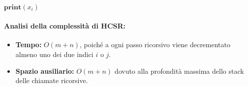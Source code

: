 \begin{algorithm}[H]
\caption{Ricostruzione della soluzione HCS}\label{alg:hcsr}
\begin{algorithmic}[1]
        \State \Return
    \EndIf
            \State {}
        \Else
            \State {}
        \EndIf
    \Else
        \State {}
        \State $\textbf{print}(x_i)$
    \EndIf
\EndProcedure
\end{algorithmic}
\end{algorithm}

\paragraph{Analisi della complessità di \textsc{HCSR}:}
\begin{itemize}
    \item \textbf{Tempo:} $O(m + n)$, poiché a ogni passo ricorsivo viene decrementato almeno uno dei due indici $i$ o $j$.
    \item \textbf{Spazio ausiliario:} $O(m + n)$ dovuto alla profondità massima dello stack delle chiamate ricorsive.
\end{itemize}
